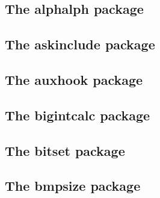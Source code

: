 \documentclass[a4paper,12pt]{article}
\makeatletter
\newcommand*{\xpackage}[1]{\textsf{#1}}
\newcommand*{\xfile}[1]{\texttt{#1}}
\newcommand*{\xoption}[1]{\textsf{#1}}
\newcommand*{\cs}[1]{\texttt{\textbackslash#1}}
\newcommand*{\tocinclude}[1]{%
  \setcounter{tocdepth}{3}%
  \begingroup
    \makeatletter
    \def\@prj{#1}%
    \let\contentsline\foreign@contentsline
  \endgroup
}
\def\foreign@contentsline#1#2#3#4{%
  \ifx\\#4\\%
    \csname l@#1\endcsname{#2}{#3}%
  \else
    \ifHy@linktocpage
      \csname l@#1\endcsname{{#2}}{%
        \hyper@linkfile{#3}{\@prj.pdf}{#4}%
      }%
    \else
      \csname l@#1\endcsname{%
        \hyper@linkfile{#2}{\@prj.pdf}{#4}%
      }{#3}%
    \fi
  \fi
}%
\newcommand*{\pkgsectformat}[1]{%
  \texorpdfstring{%
    \textcolor{link}{The} %
    \xpackage{#1} %
    \textcolor{link}{package}%
  }{#1}%
}
\makeatother
\begin{document}
\newpage
\subsection{\pkgsectformat{alphalph}}
\label{alphalph}
\begin{abstract}
The package provides methods to represent numbers with a limited
set of symbols. Both  and  are supported.
\end{abstract}
\tocinclude{alphalph}

\newpage
\subsection{\pkgsectformat{askinclude}}
\label{askinclude}
\begin{abstract}
This package replaces \cs{includeonly} by an interactive user
interface.
\end{abstract}
\tocinclude{askinclude}

\newpage
\subsection{\pkgsectformat{auxhook}}
\label{auxhook}
\begin{abstract}
Package \xpackage{auxhook} provides hooks for adding stuff at
the begin of \xfile{.aux} files.
\end{abstract}
\tocinclude{auxhook}

\newpage
\subsection{\pkgsectformat{bigintcalc}}
\label{bigintcalc}
\begin{abstract}
This package provides expandable arithmetic operations
with big integers that can exceed \TeX's number limits.
\end{abstract}
\tocinclude{bigintcalc}

\newpage
\subsection{\pkgsectformat{bitset}}
\label{bitset}
\begin{abstract}
This package defines and implements the data type bit set,
a vector of bits. The size of the vector may grow dynamically.
Individual bits can be manipulated.
\end{abstract}
\tocinclude{bitset}

\newpage
\subsection{\pkgsectformat{bmpsize}}
\label{bmpsize}
\begin{abstract}
Package \xpackage{bmpsize} analyzes bitmap images to extract
size and resolution data. It adds this feature to the graphics package
that now do not need separate bounding box files for bitmap images.
Additionally the implementation for the inclusion of bitmap images
in some drivers of package \xpackage{graphicx} are rewritten to support
options \xoption{viewport}, \xoption{trim} and \xoption{clip}.
\end{abstract}
\tocinclude{bmpsize}
\end{document}
